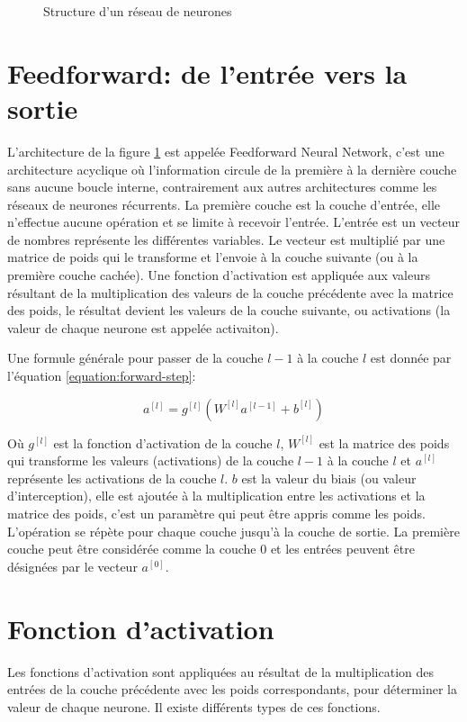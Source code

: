 \begin{figure}[h]
    \centering
	
    \caption{Structure d'un réseau de neurones}
    \label{fig:neural-network-structure}
\end{figure}

\section{Feedforward: de l'entrée vers la sortie}
\label{section:feedforward-neural-network}
L'architecture de la figure \ref{fig:neural-network-structure} est appelée Feedforward Neural Network, c'est une architecture acyclique où l'information circule de la première à la dernière couche sans aucune boucle interne, contrairement aux autres architectures comme les réseaux de neurones récurrents. La première couche est la couche d'entrée, elle n'effectue aucune opération et se limite à recevoir l'entrée. L'entrée est un vecteur de nombres représente les différentes variables. Le vecteur est multiplié par une matrice de poids qui le transforme et l'envoie à la couche suivante (ou à la première couche cachée). Une fonction d'activation est appliquée aux valeurs résultant de la multiplication des valeurs de la couche précédente avec la matrice des poids, le résultat devient les valeurs de la couche suivante, ou activations (la valeur de chaque neurone est appelée activaiton).

Une formule générale pour passer de la couche $l-1$ à la couche $l$ est donnée par l'équation \ref{equation:forward-step}:

\begin{equation}
    a^{[l]} = g^{[l]}(W^{[l]}a^{[l-1]}+b^{[l]})
    \label{equation:forward-step}
\end{equation}

Où $g^{[l]}$ est la fonction d'activation de la couche $l$, $W^{[l]}$ est la matrice des poids qui transforme les valeurs (activations) de la couche $l-1$ à la couche $l$ et $a^{[l]}$ représente les activations de la couche $l$. $b$ est la valeur du biais (ou valeur d'interception), elle est ajoutée à la multiplication entre les activations et la matrice des poids, c'est un paramètre qui peut être appris comme les poids. L'opération se répète pour chaque couche jusqu'à la couche de sortie.
La première couche peut être considérée comme la couche 0 et les entrées peuvent être désignées par le vecteur $a^{[0]}$.

\section{Fonction d'activation}
Les fonctions d'activation sont appliquées au résultat de la multiplication des entrées de la couche précédente avec les poids correspondants, pour déterminer la valeur de chaque neurone. Il existe différents types de ces fonctions.

